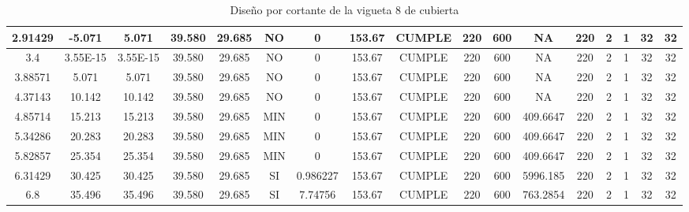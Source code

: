 \begin{table}[H]
{\begin{tabular}{|c|c|c|c|c|c|c|c|c|c|c|c|c|c|c|c|c|}
    \hline
    2.91429 & -5.071 & 5.071 & 39.580 & 29.685 & NO  & 0   & 153.67 & CUMPLE & 220 & 600 & NA  & 220 & 2   & 1   & 32  & 32 \bigstrut\\
    \hline
    3.4 & 3.55E-15 & 3.55E-15 & 39.580 & 29.685 & NO  & 0   & 153.67 & CUMPLE & 220 & 600 & NA  & 220 & 2   & 1   & 32  & 32 \bigstrut\\
    \hline
    3.88571 & 5.071 & 5.071 & 39.580 & 29.685 & NO  & 0   & 153.67 & CUMPLE & 220 & 600 & NA  & 220 & 2   & 1   & 32  & 32 \bigstrut\\
    \hline
    4.37143 & 10.142 & 10.142 & 39.580 & 29.685 & NO  & 0   & 153.67 & CUMPLE & 220 & 600 & NA  & 220 & 2   & 1   & 32  & 32 \bigstrut\\
    \hline
    4.85714 & 15.213 & 15.213 & 39.580 & 29.685 & MIN & 0   & 153.67 & CUMPLE & 220 & 600 & 409.6647 & 220 & 2   & 1   & 32  & 32 \bigstrut\\
    \hline
    5.34286 & 20.283 & 20.283 & 39.580 & 29.685 & MIN & 0   & 153.67 & CUMPLE & 220 & 600 & 409.6647 & 220 & 2   & 1   & 32  & 32 \bigstrut\\
    \hline
    5.82857 & 25.354 & 25.354 & 39.580 & 29.685 & MIN & 0   & 153.67 & CUMPLE & 220 & 600 & 409.6647 & 220 & 2   & 1   & 32  & 32 \bigstrut\\
    \hline
    6.31429 & 30.425 & 30.425 & 39.580 & 29.685 & SI  & 0.986227 & 153.67 & CUMPLE & 220 & 600 & 5996.185 & 220 & 2   & 1   & 32  & 32 \bigstrut\\
    \hline
    6.8 & 35.496 & 35.496 & 39.580 & 29.685 & SI  & 7.74756 & 153.67 & CUMPLE & 220 & 600 & 763.2854 & 220 & 2   & 1   & 32  & 32 \bigstrut\\
    \hline
    \end{tabular}}%
    \caption{Diseño por cortante de la vigueta 8 de cubierta}
  \label{tab:CORT VT8 EP}%
\end{table}%